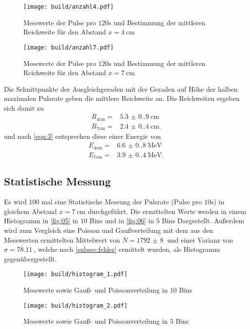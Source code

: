 \begin{figure}[H]
  \centering
  \caption{Messwerte der Pulse pro $120\unit{\second}$ und Bestimmung der mittleren Reichweite für den Abstand $x = \qty{4}{\centi\meter}$}
  \label{fig:13}
  \texttt{[image: build/anzahl4.pdf]}
\end{figure}

\begin{figure}[H]
  \centering
  \caption{Messwerte der Pulse pro $120\unit{\second}$ und Bestimmung der mittleren Reichweite für den Abstand $x = \qty{7}{\centi\meter}$}
  \label{fig:14}
  \texttt{[image: build/anzahl7.pdf]}
\end{figure}
\noindent Die Schnittpunkte der Ausgleichgeraden mit der Geraden auf Höhe der
halben maximalen Pulsrate geben die mittlere Reichweite an. Die Reichweiten
ergeben sich damit zu 
\begin{align}
  R_\text{4cm} = &\qty{5.3(0.9)}{\centi\meter} \\
  R_\text{7cm} = &\qty{2.4(0.4)}{\centi\meter}.
\end{align}
und nach \autoref{eqn:3} entsprechen diese einer Energie von
\begin{align}
  E_\text{4cm} = &\qty{6.6(0.8)}{\mega\electronvolt} \\
  E_\text{7cm} = &\qty{3.9(0.4)}{\mega\electronvolt}.
\end{align}

\subsection{Statistische Messung}
Es wird $100$ mal eine Statistische Messung der Pulsrate (Pulse pro $10\unit{\second}$) in gleichem Abstand $x=\qty{7}{\centi\meter}$ 
durchgeführt. Die ermittelten Werte werden in einem Histogramm in \autoref{fig:05} in $10$ Bins und in \autoref{fig:06} in $5$ Bins Dargestellt. 
Außerdem wird zum Vergleich eine Poisson und Gaußverteilung mit dem aus den Messwerten ermittelten Mittelwert von $\overline{N} = \qty{1792(8)}{}$ und einer Varianz von 
$\sigma = \qty{78.11}{}$, welche nach \autoref{subsec:fehler} ermittelt wurden, 
als Histogramm gegenübergestellt.
\begin{figure}[H]
  \centering
  \caption{Messwerte sowie Gauß- und Poissonverteilung in $10$ Bins}
  \label{fig:05}
  \texttt{[image: build/histogram\_1.pdf]}
\end{figure}
\begin{figure}[H]
  \centering
  \caption{Messwerte sowie Gauß- und Poissonverteilung in $5$ Bins}
  \label{fig:06}
  \texttt{[image: build/histogram\_2.pdf]}
\end{figure}